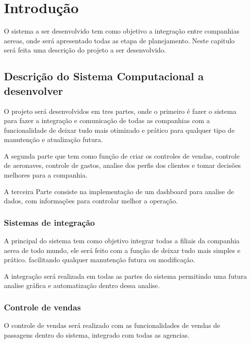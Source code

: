 

\chapter{ Introdu\c{c}\~{a}o}

O sistema a ser desenvolvido tem como objetivo a integração entre
companhias aereas, onde será
apresentado todas as etapa de planejamento. 
Neste capitulo será feita uma descrição do projeto
a ser desenvolvido.

\section{Descri\c{c}\~{a}o do Sistema Computacional a desenvolver}
O projeto será desenvolvidos em tres partes, onde o primeiro é fazer o sistema para fazer a integração 
e comunicação de todas as companhias com a funcionalidade de deixar tudo mais otimizado e prático para
qualquer tipo de manutenção e atualização futura.

A segunda parte que tem como função de criar os controles de vendas, controle de aeronaves, 
controle de gastos, analise dos perfis dos clientes e tomar decisões melhores para a companhia.

A terceira Parte consiste na implementação de um dashboard para analise de dados, com informações 
para controlar melhor a operação.

\subsection{Sistemas de integração}
A principal do sistema tem como objetivo integrar todas a 
filiais da companhia aerea de todo mundo, ele será 
feito com a função de deixar tudo mais simples e prático.
facilitando qualquer manutenção futura ou modificação.

A integração será realizada em todas as partes do
sistema permitindo uma futura analise gráfica
e automatização dentro dessa analise.


\subsection{Controle de vendas}
O controle de vendas será realizado com as funcionalidades 
de vendas de passagens dentro do sistema, integrado com todas
as agencias. 

